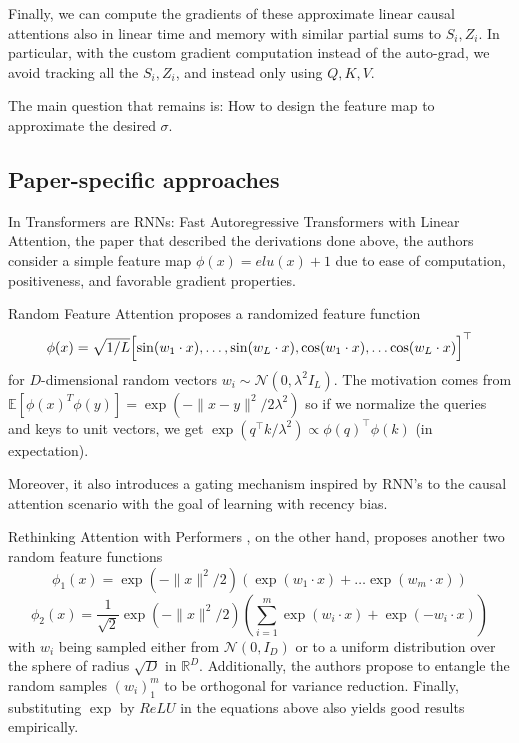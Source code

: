 Finally, we can compute the gradients of these approximate linear causal attentions also in linear time and memory with similar partial sums to $S_i, Z_i$. In particular, with the custom gradient computation instead of the auto-grad, we avoid tracking all the $S_i, Z_i$, and instead only using $Q, K, V$. 

The main question that remains is: How to design the feature map to approximate the desired $\sigma$.

\subsection{Paper-specific approaches}

In Transformers are RNNs: Fast Autoregressive Transformers with Linear Attention\cite{katharopoulos2020transformers}, the paper that described the derivations done above, the authors consider a simple feature map $\phi(x) = elu(x) + 1$ due to ease of computation, positiveness, and favorable gradient properties.

\vspace{1em}
 
Random Feature Attention \cite{peng2021random} proposes a randomized feature function 
$$
\phi(x) = \sqrt{1/L} \Bigl[ \sin(w_1 \cdot x), \ldots, \sin(w_L \cdot x), \cos(w_1 \cdot x), \ldots \cos(w_L \cdot x) \Bigr]^\top
$$
for $D$-dimensional random vectors $w_i \sim \mathcal{N}(0, \lambda^2 I_L) $. The motivation comes from $\mathbb{E}[\phi(x)^T \phi(y)] = \exp(- \| x - y \|^2 / 2\lambda^2)$ so if we normalize the queries and keys to unit vectors, we get $\exp(q^\top k /\lambda^2) \propto \phi(q)^\top \phi(k) $ (in expectation).

Moreover, it also introduces a gating mechanism inspired by RNN's to the causal attention scenario with the goal of learning with recency bias.

\vspace{1em}

Rethinking Attention with Performers \cite{choromanski2022rethinking}, on the other hand, proposes another two random feature functions $$\phi_1(x) = \exp(-\|x\|^2/2)(\exp(w_1 \cdot x) + \ldots \exp(w_m \cdot x))$$  $$\phi_2(x) = \frac{1}{\sqrt{2}}\exp(-\|x\|^2/2)(\sum_{i=1}^m \exp(w_i \cdot x) + \exp(-w_i \cdot x))$$ with $w_i$ being sampled either from $\mathcal{N}(0, I_D)$ or to a uniform distribution over the sphere of radius $\sqrt{D}$ in $\mathbb{R}^D$. Additionally, the authors propose to entangle the random samples $(w_i)_1^m$ to be orthogonal for variance reduction. Finally, substituting $\exp$ by $ReLU$ in the equations above also yields good results empirically.

